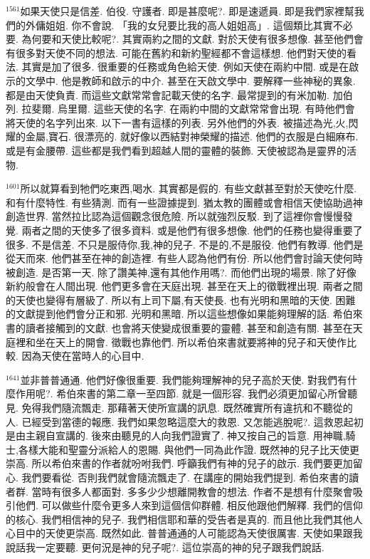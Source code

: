 \documentclass{book}
\begin{document}
$^{1561}$如果天使只是信差.
伯役.
守護者.
即是甚麼呢?.
即是速遞員.
即是我們家裡幫我們的外傭姐姐.
你不會說.
「我的女兒要比我的高人姐姐高」.
這個類比其實不必要.
為何要和天使比較呢?.
其實兩約之間的文獻.
對於天使有很多想像.
甚至他們會有很多對天使不同的想法.
可能在舊約和新約聖經都不會這樣想.
他們對天使的看法.
其實是加了很多.
很重要的任務或角色給天使.
例如天使在兩約中間.
或是在啟示的文學中.
他是教師和啟示的中介.
甚至在天啟文學中.
要解釋一些神秘的異象.
都是由天使負責.
而這些文獻常常會記載天使的名字.
最常提到的有米加勒.
加伯列.
拉斐爾.
烏里爾.
這些天使的名字.
在兩約中間的文獻常常會出現.
有時他們會將天使的名字列出來.
以下一書有這樣的列表.
另外他們的外表.
被描述為光,火,閃耀的金屬,寶石.
很漂亮的.
就好像以西結對神榮耀的描述.
他們的衣服是白細麻布.
或是有金腰帶.
這些都是我們看到超越人間的靈體的裝飾.
天使被認為是靈界的活物.

$^{1601}$所以就算看到牠們吃東西,喝水.
其實都是假的.
有些文獻甚至對於天使吃什麼.
和有什麼特性.
有些猜測.
而有一些證據提到.
猶太教的團體或會相信天使協助過神創造世界.
當然拉比認為這個觀念很危險.
所以就強烈反駁.
到了這裡你會慢慢發覺.
兩者之間的天使多了很多資料.
或是他們有很多想像.
他們的任務也變得重要了很多.
不是信差.
不只是服侍你,我,神的兒子.
不是的,不是服役.
他們有教導.
他們是從天而來.
他們甚至在神的創造裡.
有些人認為他們有份.
所以他們會討論天使何時被創造.
是否第一天.
除了讚美神,還有其他作用嗎?.
而他們出現的場景.
除了好像新約般會在人間出現.
他們更多會在天庭出現.
甚至在天上的徵戰裡出現.
兩者之間的天使也變得有層級了.
所以有上司下屬,有天使長.
也有光明和黑暗的天使.
困難的文獻提到他們會分正和邪.
光明和黑暗.
所以這些想像如果能夠理解的話.
希伯來書的讀者接觸到的文獻.
也會將天使變成很重要的靈體.
甚至和創造有關.
甚至在天庭裡和坐在天上的開會.
徵戰也靠他們.
所以希伯來書就要將神的兒子和天使作比較.
因為天使在當時人的心目中.

$^{1641}$並非普普通通.
他們好像很重要.
我們能夠理解神的兒子高於天使.
對我們有什麼作用呢?.
希伯來書的第二章一至四節.
就是一個形容.
我們必須更加留心所曾聽見.
免得我們隨流飄走.
那藉著天使所宣講的訊息.
既然確實所有違抗和不聽從的人.
已經受到當德的報應.
我們如果忽略這麼大的救恩.
又怎能逃脫呢?.
這救恩起初是由主親自宣講的.
後來由聽見的人向我們證實了.
神又按自己的旨意.
用神職,騎士,各樣大能和聖靈分派給人的恩賜.
與他們一同為此作證.
既然神的兒子比天使更崇高.
所以希伯來書的作者就吩咐我們.
呼籲我們有神的兒子的啟示.
我們要更加留心.
我們要看從.
否則我們就會隨流飄走了.
在講座的開始我們提到.
希伯來書的讀者群.
當時有很多人都面對.
多多少少想離開教會的想法.
作者不是想有什麼聚會吸引他們.
可以做些什麼令更多人來到這個信仰群體.
相反他跟他們解釋.
我們的信仰的核心.
我們相信神的兒子.
我們相信耶和華的受告者是真的.
而且他比我們其他人心目中的天使更崇高.
既然如此.
普普通通的人可能認為天使很厲害.
天使如果跟我說話我一定要聽.
更何況是神的兒子呢?.
這位崇高的神的兒子跟我們說話.
\end{document}
